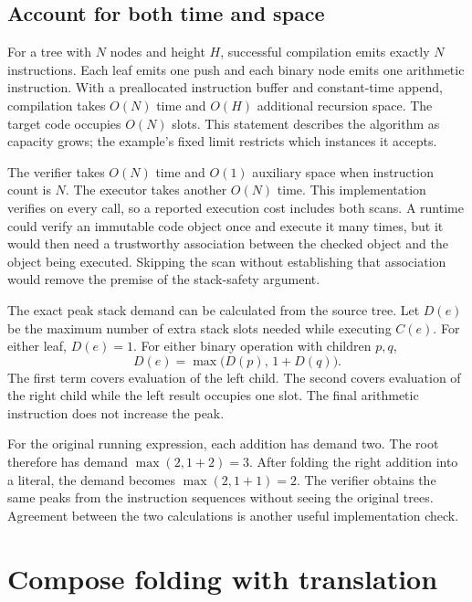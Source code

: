 \subsection{Account for both time and space}
\label{sec:tiny-stack-costs}

For a tree with $N$ nodes and height $H$, successful compilation emits exactly $N$ instructions.
Each leaf emits one push and each binary node emits one arithmetic instruction.
With a preallocated instruction buffer and constant-time append, compilation takes $O(N)$ time and $O(H)$ additional recursion space.
The target code occupies $O(N)$ slots.
This statement describes the algorithm as capacity grows; the example's fixed limit restricts which instances it accepts.

The verifier takes $O(N)$ time and $O(1)$ auxiliary space when instruction count is $N$.
The executor takes another $O(N)$ time.
This implementation verifies on every call, so a reported execution cost includes both scans.
A runtime could verify an immutable code object once and execute it many times, but it would then need a trustworthy association between the checked object and the object being executed.
Skipping the scan without establishing that association would remove the premise of the stack-safety argument.

The exact peak stack demand can be calculated from the source tree.
Let $D(e)$ be the maximum number of extra stack slots needed while executing $C(e)$.
For either leaf, $D(e)=1$.
For either binary operation with children $p,q$,
\begin{equation}
  D(e)=\max\bigl(D(p),\,1+D(q)\bigr).
  \label{eq:tiny-stack-demand}
\end{equation}
The first term covers evaluation of the left child.
The second covers evaluation of the right child while the left result occupies one slot.
The final arithmetic instruction does not increase the peak.

For the original running expression, each addition has demand two.
The root therefore has demand $\max(2,1+2)=3$.
After folding the right addition into a literal, the demand becomes $\max(2,1+1)=2$.
The verifier obtains the same peaks from the instruction sequences without seeing the original trees.
Agreement between the two calculations is another useful implementation check.

\section{Compose folding with translation}
\label{sec:tiny-stack-composition}

